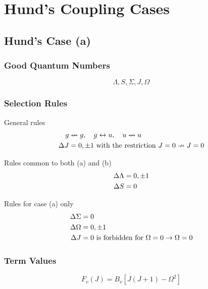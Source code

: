 \chapter{Hund's Coupling Cases}
\label{c:hunds_coupling_cases}

\section{Hund's Case (a)}
\label{s:hunds_case_a}

\subsection{Good Quantum Numbers}

\begin{equation*}
    \Lambda, S, \Sigma, J, \Omega
\end{equation*}

\subsection{Selection Rules}

General rules
\begin{align*}
    g        & \nleftrightarrow g, \quad g \leftrightarrow u, \quad u \nleftrightarrow u \\
    \adif{J} & = 0, \pm 1 \text{ with the restriction } J = 0 \nrightarrow J = 0
\end{align*}

Rules common to both (a) and (b)
\begin{align*}
    \adif{\Lambda} & = 0, \pm 1 \\
    \adif{S}       & = 0
\end{align*}

Rules for case (a) only
\begin{align*}
    \adif{\Sigma} & = 0                                                             \\
    \adif{\Omega} & = 0, \pm 1                                                      \\
    \adif{J}      & = 0 \text{ is forbidden for } \Omega = 0 \rightarrow \Omega = 0
\end{align*}

\subsection{Term Values}

\begin{equation*}
    F_{v}(J) = B_{v}[J(J + 1) - \Omega^{2}]
\end{equation*}

